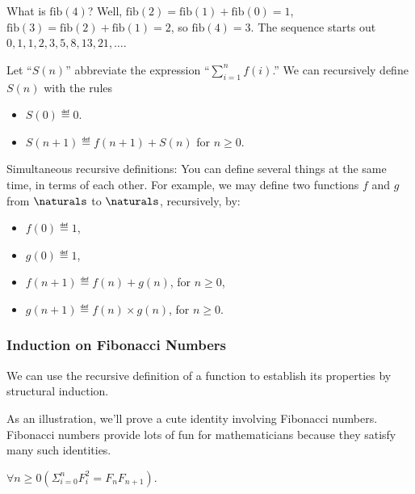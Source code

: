 \begin{definition}
\begin{description}
What is $\text{fib}(4)$?  Well, $\text{fib}(2) =
\text{fib}(1)+\text{fib}(0) = 1$, $\text{fib}(3) =
\text{fib}(2)+\text{fib}(1) = 2$, so $\text{fib}(4) = 3$.  The sequence
starts out $0, 1, 1, 2, 3, 5, 8, 13, 21,\dots$.


\item[Sum-notation.]  Let ``$S(n)$'' abbreviate the expression
``$\sum_{i=1}^n f(i)$.''  We can recursively define $S(n)$ with the rules
  \begin{itemize}
  \item $S(0) \eqdef 0$.
  \item $S(n+1) \eqdef  f(n+1) + S(n)$ for $n\geq 0$.
  \end{itemize}

\begin{staffnotes}

\item[Simultaneous recursive definitions:]
  You can define several things at the same time, in terms of each
  other.  For example, we may define two functions $f$ and $g$ from
  $\naturals$ to $\naturals$, recursively, by:
  \begin{itemize}
  \item
    $f(0) \eqdef 1$,
  \item
    $g(0) \eqdef 1$,
  \item
    $f(n+1) \eqdef f(n) + g(n)$, for $n \geq 0$,
  \item
    $g(n+1) \eqdef f(n) \times g(n)$, for $n \geq 0$.
  \end{itemize}

\end{staffnotes}

\end{description}

\begin{staffnotes}

\subsubsection{Induction on Fibonacci Numbers}

We can use the recursive definition of a function to establish its
properties by structural induction.

As an illustration, we'll prove a cute identity involving Fibonacci
numbers.  Fibonacci numbers provide lots of fun for mathematicians because
they satisfy many such identities.
\begin{proposition}
  $\forall n \geq 0 (\Sigma_{i=0}^n F_i^2 = F_n F_{n+1})$.
\end{proposition}


\end{staffnotes}
\end{definition}
